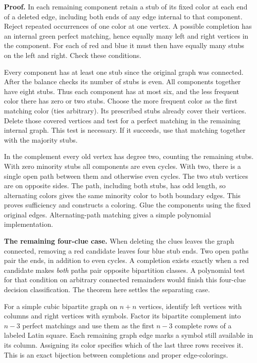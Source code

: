 \documentclass[11pt,letterpaper]{article}
\newcommand{\hd}[1]{\par\medskip{\large\bfseries\color{pine}#1}\par\nobreak}
\newcommand{\lead}[1]{\textbf{\color{ink}#1}\enspace}
\begin{document}
\lead{Proof.} In each remaining component retain a stub of its fixed color at each end of a deleted edge, including both ends of any edge internal to that component. Reject repeated occurrences of one color at one vertex. A possible completion has an internal green perfect matching, hence equally many left and right vertices in the component. For each of red and blue it must then have equally many stubs on the left and right. Check these conditions.

Every component has at least one stub since the original graph was connected. After the balance checks its number of stubs is even. All components together have eight stubs. Thus each component has at most six, and the less frequent color there has zero or two stubs. Choose the more frequent color as the first matching color (ties arbitrary). Its prescribed stubs already cover their vertices. Delete those covered vertices and test for a perfect matching in the remaining internal graph. This test is necessary. If it succeeds, use that matching together with the majority stubs.

In the complement every old vertex has degree two, counting the remaining stubs. With zero minority stubs all components are even cycles. With two, there is a single open path between them and otherwise even cycles. The two stub vertices are on opposite sides. The path, including both stubs, has odd length, so alternating colors gives the same minority color to both boundary edges. This proves sufficiency and constructs a coloring. Glue the components using the fixed original edges. Alternating-path matching gives a simple polynomial implementation.

\lead{The remaining four-clue case.} When deleting the clues leaves the graph connected, removing a red candidate leaves four blue stub ends. Two open paths pair the ends, in addition to even cycles. A completion exists exactly when a red candidate makes \emph{both} paths pair opposite bipartition classes. A polynomial test for that condition on arbitrary connected remainders would finish this four-clue decision classification. The theorem here settles the separating case.

\hd{Two entries in a Latin square encode parity}
For a simple cubic bipartite graph on $n+n$ vertices, identify left vertices with columns and right vertices with symbols. Factor its bipartite complement into $n-3$ perfect matchings and use them as the first $n-3$ complete rows of a labeled Latin square. Each remaining graph edge marks a symbol still available in its column. Assigning its color specifies which of the last three rows receives it. This is an exact bijection between completions and proper edge-colorings.
\end{document}
